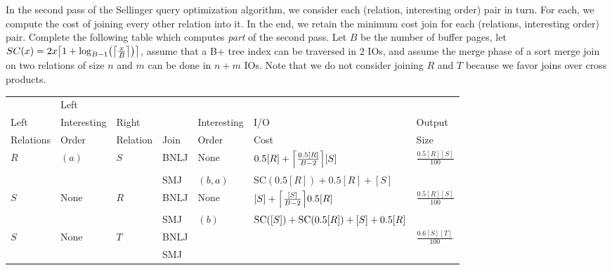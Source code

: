 \documentclass{article}
\newcommand{\sol}[1]{\iftoggle{showsolutions}{\textcolor{red}{#1}}{\phantom{#1}}}
\begin{document}
In the second pass of the Sellinger query optimization algorithm, we consider
each (relation, interesting order) pair in turn. For each, we compute the cost
of joining every other relation into it. In the end, we retain the minimum cost
join for each (relations, interesting order) pair. Complete the following table
which computes \emph{part} of the second pass. Let $B$ be the number of buffer
pages, let $SC(x) = \sortcost{x}$, assume that a B+ tree index can be traversed
in 2 IOs, and assume the merge phase of a sort merge join on two relations of
size $n$ and $m$ can be done in $n + m$ IOs. Note that we do not consider
joining $R$ and $T$ because we favor joins over cross products.
\begin{center}
  \begin{tabular}{|l|l|l|l|l|l|l|}
    \hline
                          & Left                   &                      &      &                &                                       & \\
    Left                  & Interesting            & Right                &      & Interesting    & I/O                                   & Output                                   \\
    Relations             & Order                  & Relation             & Join & Order          & Cost                                  & Size                                     \\\hline
    \multirow{2}{*}{$R$}  & \multirow{2}{*}{$(a)$} & \multirow{2}{*}{$S$} & BNLJ & None           & $\bnlj{0.5[R]}{[S]}$                  & \multirow{2}{*}{$\frac{0.5[R][S]}{100}$} \\\cline{4-6}
                          &                        &                      & SMJ  & $(b, a)$       & $\text{SC}(0.5[R]) + 0.5[R] + [S]$    & \\\hline
    \multirow{2}{*}{$S$}  & \multirow{2}{*}{None}  & \multirow{2}{*}{$R$} & BNLJ & None           & $\bnlj{[S]}{0.5[R]}$                  & \multirow{2}{*}{$\frac{0.5[R][S]}{100}$} \\\cline{4-6}
                          &                        &                      & SMJ  & $(b)$          & $\text{SC}([S]) + \text{SC}(0.5[R]) + [S] + 0.5[R]$                   & \\\hline
    \multirow{2}{*}{$S$}  & \multirow{2}{*}{None}  & \multirow{2}{*}{$T$} & BNLJ & \sol{None}     & \sol{$\bnlj{[S]}{0.6[T]}$}            & \multirow{2}{*}{$\frac{0.6[S][T]}{100}$} \\\cline{4-6}
                          &                        &                      & SMJ  & \sol{$(c)$}    & \sol{$\text{SC}([S]) + [S] + 0.6[T]$} & \\\hline

\end{tabular}
\end{center}
\end{document}
